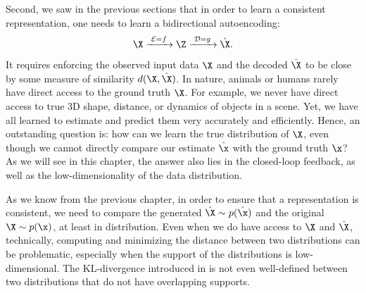 \documentclass[../../book-main.tex]{subfiles}
\begin{document}
Second, we saw in the previous sections that in order to learn a consistent representation, one needs to learn a bidirectional autoencoding:
\begin{equation}
 \X
\xrightarrow{\hspace{1mm} \mathcal{E} = f \hspace{1mm}} \Z  \xrightarrow{\hspace{1mm} \mathcal{D} = g \hspace{1mm}} \hat{\X}.
\end{equation}
It requires enforcing the observed input data $\X$ and the decoded $\hat \X$ to be close by some measure of similarity $d(\X, \hat \X)$. In nature, animals or humans rarely have direct access to the ground truth $\X$. For example, we never have direct access to true 3D shape, distance, or dynamics of objects in a scene. Yet, we have all learned to estimate and predict them very accurately and efficiently. Hence, an outstanding question is: how can we learn the true distribution of $\X$, even though we cannot directly compare our estimate $\hat \x$ with the ground truth $\x$? As we will see in this chapter, the answer also lies in the closed-loop feedback, as well as the low-dimensionality of the data distribution. 






As we know from the previous chapter, in order to ensure that a representation is consistent, we need to compare the generated $\hat \X \sim p(\hat\x)$ and the original $\X \sim p(\x)$, at least in distribution. Even when we do have access to $\X$ and $\hat \X$, technically, computing and minimizing the distance between two distributions can be problematic, especially when the support of the distributions is low-dimensional. The KL-divergence introduced in  is not even well-defined between two distributions that do not have overlapping supports. 
\end{document}
